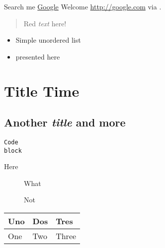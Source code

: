 Search me \href{http://google.com}{Google}
Welcome \href{http://google.com}{http://google.com} via .

\begin{quote}   %
Red \emph{text} here!
\end{quote}   %

\begin{itemize}
\item Simple unordered list
\item presented here
\end{itemize}

\section{Title Time}\hypertarget{title-time}{}\label{title-time}

\subsection{Another \emph{title} and more}\hypertarget{hot}{}\label{hot}

\begin{verbatim}Code
block
\end{verbatim}

\begin{description}
\item[Here] What



Not
\end{description}

\begin{longtable}{|l|l|l|}
\hline
Uno & Dos & Tres\\
\hline
One & Two & Three\\
\hline
\end{longtable}

